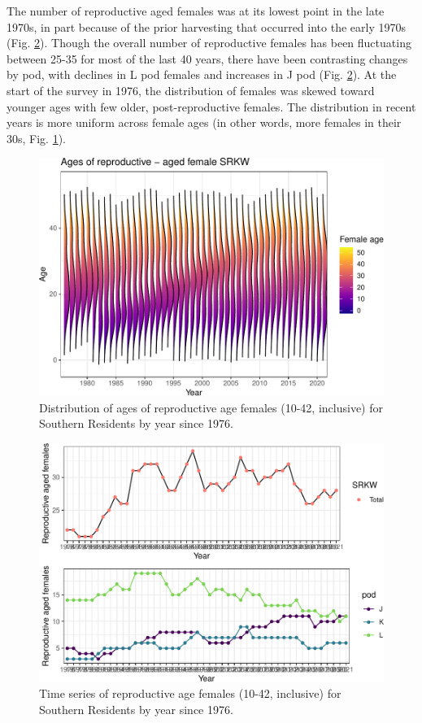 \documentclass[]{article}
\begin{document}
The number of reproductive aged females was at its lowest point in the
late 1970s, in part because of the prior harvesting that occurred into
the early 1970s (Fig. \ref{fig:ts-repro-females}). Though the overall
number of reproductive females has been fluctuating between 25-35 for
most of the last 40 years, there have been contrasting changes by pod,
with declines in L pod females and increases in J pod (Fig.
\ref{fig:ts-repro-females}). At the start of the survey in 1976, the
distribution of females was skewed toward younger ages with few older,
post-reproductive females. The distribution in recent years is more
uniform across female ages (in other words, more females in their 30s,
Fig. \ref{fig:plot-repro-females}).

\begin{figure}
\centering
\includegraphics{status_update_files/figure-latex/reprofemales-1.pdf}
\caption{Distribution of ages of reproductive age females (10-42,
inclusive) for Southern Residents by year since 1976.
\label{fig:plot-repro-females}}
\end{figure}

\begin{figure}
\centering
\includegraphics{status_update_files/figure-latex/reprots-1.pdf}
\caption{Time series of reproductive age females (10-42, inclusive) for
Southern Residents by year since 1976. \label{fig:ts-repro-females}}
\end{figure}
\end{document}
